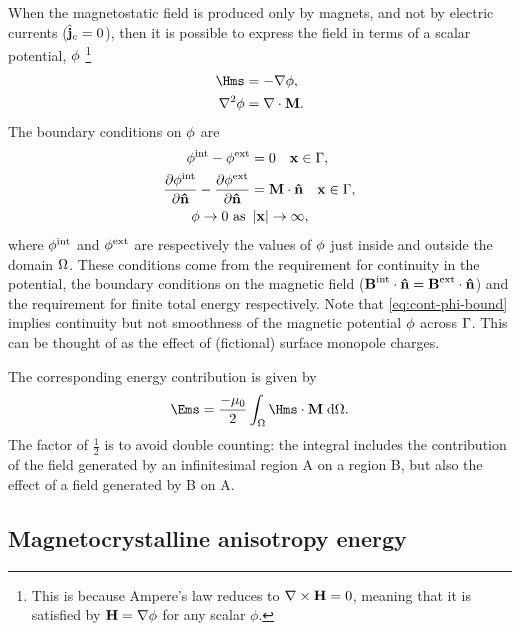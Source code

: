 When the magnetostatic field is produced only by magnets, and not by electric currents (\ie ${\hat{\mathbf{j}}}_c = 0$), then it is possible to express the field in terms of a scalar potential, $\phi$ \cite[46]{Coey2010}\footnote{This is because Ampere's law reduces to $\nabla \times \boldsymbol{\mathrm{H}} = 0$, meaning that it is satisfied by $\boldsymbol{\mathrm{H}} = \nabla \phi$ for any scalar $\phi$.}
\begin{equation}
  \begin{aligned}
    \label{eq:Hms}
    \Hms &= - \grad \phim, \\
    \lap \phim &= \div \Mv.
  \end{aligned}
\end{equation}
The boundary conditions on $\phi$ are
\begin{equation}
  \begin{aligned}
    \label{eq:cont-phi-bound}
    \phi^{\mathrm{int}} - \phi^{\mathrm{ext}} &= 0 \quad \boldsymbol{\mathrm{x}} \in {\Gamma}, \\
    \frac{\partial \phi^{\mathrm{int}}}{\partial \boldsymbol{\mathrm{\hat{n}}}} - \frac{\partial \phi^{\mathrm{ext}}}{\partial \boldsymbol{\mathrm{\hat{n}}}} &= \boldsymbol{\mathrm{M}} \cdot \boldsymbol{\mathrm{\hat{n}}} \quad \boldsymbol{\mathrm{x}} \in {\Gamma}, \\
    \phi \rightarrow 0 \text{ as } &\left|{\boldsymbol{\mathrm{x}}} \right| \rightarrow \infty,
  \end{aligned}
\end{equation}
where $\phi^{\mathrm{int}}$ and $\phi^{\mathrm{ext}}$ are respectively the values of $\phi$ just inside and outside the domain $\Omega$.
These conditions come from the requirement for continuity in the potential, the boundary conditions on the magnetic field ($\boldsymbol{\mathrm{B}}^\text{int} \cdot \boldsymbol{\mathrm{\hat{n}}} = \boldsymbol{\mathrm{B}}^\text{ext} \cdot \boldsymbol{\mathrm{\hat{n}}}$) and the requirement for finite total energy respectively.
Note that \cref{eq:cont-phi-bound} implies continuity but not smoothness of the magnetic potential $\phi$ across ${\Gamma}$.
This can be thought of as the effect of (fictional) surface monopole charges.

The corresponding energy contribution is given by
\begin{equation}
  \label{eq:41}
  \Ems =  \frac{-\mu_0}{2} \int_{\magd} \Hms \cdot \Mv \d \magd.
\end{equation}
The factor of $\frac{1}{2}$ is to avoid double counting: the integral includes the contribution of the field generated by an infinitesimal region A on a region B, but also the effect of a field generated by B on A.

\subsection{Magnetocrystalline anisotropy energy}
\label{sec:magn-anis}

